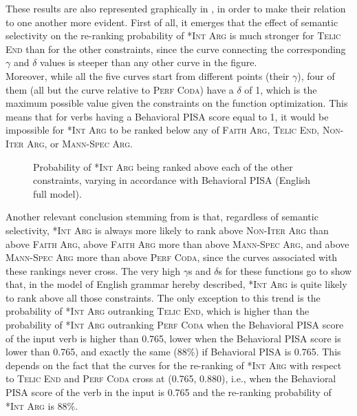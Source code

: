 These results are also represented graphically in , in order to make their relation to one another more evident. First of all, it emerges that the effect of semantic selectivity on the re-ranking probability of \textsc{*Int Arg} is much stronger for \textsc{Telic End} than for the other constraints, since the curve connecting the corresponding $\gamma$ and $\delta$ values is steeper than any other curve in the figure.\\
Moreover, while all the five curves start from different points (their $\gamma$), four of them (all but the curve relative to \textsc{Perf Coda}) have a $\delta$ of 1, which is the maximum possible value given the constraints on the function optimization. This means that for verbs having a Behavioral PISA score equal to 1, it would be impossible for \textsc{*Int Arg} to be ranked below any of \textsc{Faith Arg}, \textsc{Telic End}, \textsc{Non-Iter Arg}, or \textsc{Mann-Spec Arg}.

\begin{figure}[htb]
\caption{Probability of \textsc{*Int Arg} being ranked above each of the other constraints, varying in accordance with Behavioral PISA (English full model).}
    
\end{figure}

Another relevant conclusion stemming from  is that, regardless of semantic selectivity, \textsc{*Int Arg} is always more likely to rank above \textsc{Non-Iter Arg} than above \textsc{Faith Arg}, above \textsc{Faith Arg} more than above \textsc{Mann-Spec Arg}, and above \textsc{Mann-Spec Arg} more than above \textsc{Perf Coda}, since the curves associated with these rankings never cross. The very high $\gamma$s and $\delta$s for these functions go to show that, in the model of English grammar hereby described, \textsc{*Int Arg} is quite likely to rank above all those constraints. The only exception to this trend is the probability of \textsc{*Int Arg} outranking \textsc{Telic End}, which is higher than the probability of \textsc{*Int Arg} outranking \textsc{Perf Coda} when the Behavioral PISA score of the input verb is higher than 0.765, lower when the Behavioral PISA score is lower than 0.765, and exactly the same (88\%) if Behavioral PISA is 0.765. This depends on the fact that the curves for the re-ranking of \textsc{*Int Arg} with respect to \textsc{Telic End} and \textsc{Perf Coda} cross at (0.765, 0.880), i.e., when the Behavioral PISA score of the verb in the input is 0.765 and the re-ranking probability of \textsc{*Int Arg} is 88\%.

